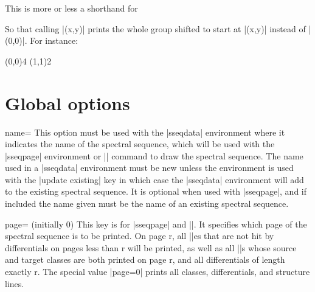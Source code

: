 \documentclass{ltxdoc}
\begin{document}
\begin{sseqdata}[name=ex1,degree={#1}{1-#1}]
\begin{command}{\sseqnewgroup{}}
This is more or less a shorthand for
\begin{codeexample}[code only, code=white]
\sseqnewcmd\opt{*}\cscolor{(\obscurexname,\obscureyname)}
\end{codeexample}
So that calling |\mygroup(x,y)| prints the whole group shifted to start at |(x,y)| instead of |(0,0)|. For instance:
\begin{codeexample}[]
\sseqnewgroup*{}
\begin{sseqpage}
\tower[orange](0,0){4}
\tower[red](1,1){2}
\end{sseqpage}
\end{codeexample}
\end{command}

\section{Global options}
\begin{key}{name=}
This option must be used with the |sseqdata| environment where it indicates the name of the spectral sequence, which will be used with the |sseqpage| environment or |\printpage| command to draw the spectral sequence. The name used in a |sseqdata| environment must be new unless the environment is used with the |update existing| key in which case the |sseqdata| environment will add to the existing spectral sequence. It is optional when used with |sseqpage|, and if included the name given must be the name of an existing spectral sequence.
\end{key}

\begin{key}{page= (initially 0)}
This key is for |sseqpage| and |\printpage|. It specifies which page of the spectral sequence is to be printed. On page r, all |\class|es that are not hit by differentials on pages less than r will be printed, as well as all |\structline|s whose source and target classes are both printed on page r, and all differentials of length exactly r. The special value |page=0| prints all classes, differentials, and structure lines.
\end{key}


\end{sseqdata}
\end{document}
